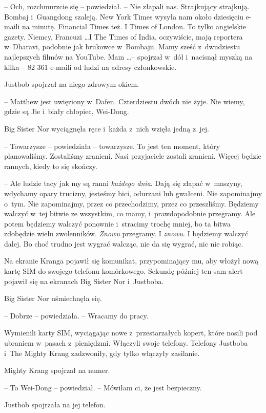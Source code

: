 \documentclass[oneside,polish,11pt,rmheadings]{mwbk}
\begin{document}
-- Och, rozchmurzcie się -- powiedział. -- Nie złapali nas. Strajkujący strajkują. Bombaj i~Guangdong szaleją. New York Times wysyła nam około dziesięciu e-maili na minutę. Financial Times też. I Times of London. To tylko angielskie gazety. Niemcy, Francuzi \ldots  I The Times of India, oczywiście, mają reportera w~Dharavi, podobnie jak brukowce w~Bombaju. Mamy sześć z~dwudziestu najlepszych filmów na YouTube. Mam \ldots  -- spojrzał w~dół i~nacisnął myszką na kilka -- 82 361 e-maili od ludzi na adresy członkowskie.

Justbob spojrzał na niego zdrowym okiem. 

-- Matthew jest uwięziony w~Dafen. Czterdziestu dwóch nie żyje. Nie wiemy, gdzie są Jie i~biały chłopiec, Wei-Dong.

Big Sister Nor wyciągnęła ręce i~każda z~nich wzięła jedną z~jej. 

-- Towarzysze -- powiedziała -- towarzysze. To jest ten moment, który planowaliśmy. Zostaliśmy zranieni. Nasi przyjaciele zostali zranieni. Więcej będzie rannych, kiedy to się skończy.

-- Ale ludzie tacy jak my są ranni \textit{każdego dnia}. Dają się złapać w~maszyny, wdychamy opary trucizny, jesteśmy bici, odurzani lub gwałceni. Nie zapominajmy o~tym. Nie zapominajmy, przez co przechodzimy, przez co przeszliśmy. Będziemy walczyć w~tej bitwie ze wszystkim, co mamy, i~prawdopodobnie przegramy. Ale potem będziemy walczyć ponownie i~stracimy trochę mniej, bo ta bitwa zdobędzie wielu zwolenników. \textit{Znowu }przegramy. I \textit{znowu}. I będziemy walczyć dalej. Bo choć trudno jest wygrać walcząc, nie da się wygrać, nic nie robiąc.

Na ekranie Kranga pojawił się komunikat, przypominający mu, aby włożył nową kartę SIM do swojego telefonu komórkowego. Sekundę później ten sam alert pojawił się na ekranach Big Sister Nor i~Justboba.

Big Sister Nor uśmiechnęła się. 

-- Dobrze -- powiedziała. -- Wracamy do pracy.

Wymienili karty SIM, wyciągając nowe z~przestarzałych kopert, które nosili pod ubraniem w~pasach z~pieniędzmi. Włączyli swoje telefony. Telefony Justboba i~The Mighty Krang zadzwoniły, gdy tylko włączyły zasilanie.

Mighty Krang spojrzał na numer. 

-- To Wei-Dong -- powiedział. -- Mówiłam ci, że jest bezpieczny.

Justbob spojrzała na jej telefon. 
\end{document}

